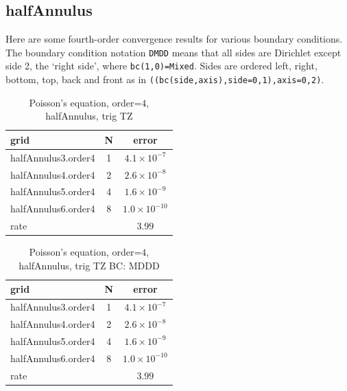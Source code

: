 \clearpage
\subsection{halfAnnulus}

Here are some fourth-order convergence results for various boundary conditions.
The boundary condition notation {\tt DMDD} means that all sides are Dirichlet 
except side 2, the `right side', where {\tt bc(1,0)=Mixed}.
Sides are ordered left, right, bottom, top, back and front as in {\tt ((bc(side,axis),side=0,1),axis=0,2)}.

\begin{table}[hbt]
\begin{center}
\begin{tabular}{|l|c|c|} \hline\hline 
grid  & N &  error \\ \hline 
 halfAnnulus3.order4 &     1 &  $4.1\times10^{ -7}$   \\ \hline
 halfAnnulus4.order4 &     2 &  $2.6\times10^{ -8}$   \\ \hline
 halfAnnulus5.order4 &     4 &  $1.6\times10^{ -9}$   \\ \hline
 halfAnnulus6.order4 &     8 &  $1.0\times10^{-10}$   \\ \hline
    rate            &     &       $3.99$  \\ \hline\hline
\end{tabular}
\caption{Poisson's equation, order=$4$, halfAnnulus, trig TZ }\label{table:halfAnnulus}
\end{center}
\end{table}

\begin{table}[hbt]
\begin{center}
\begin{tabular}{|l|c|c|} \hline\hline 
grid  & N &  error \\ \hline 
 halfAnnulus3.order4 &     1 &  $4.1\times10^{ -7}$   \\ \hline
 halfAnnulus4.order4 &     2 &  $2.6\times10^{ -8}$   \\ \hline
 halfAnnulus5.order4 &     4 &  $1.6\times10^{ -9}$   \\ \hline
 halfAnnulus6.order4 &     8 &  $1.0\times10^{-10}$   \\ \hline
    rate            &     &       $3.99$  \\ \hline\hline
\end{tabular}
\caption{Poisson's equation, order=$4$, halfAnnulus, trig TZ BC: MDDD}\label{table:halfAnnulus}
\end{center}
\end{table}

